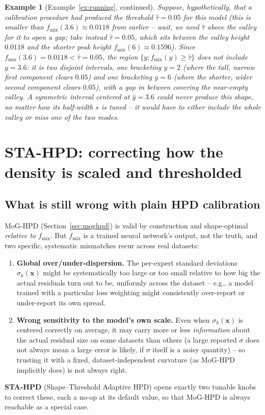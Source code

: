 \documentclass[11pt]{article}
\newtheorem{example}{Example}[section]
\begin{document}
\begin{example}[Example~\ref{ex:running}, continued]
Suppose, hypothetically, that a calibration procedure had produced the threshold $\hat\tau =
0.05$ for this model (this is smaller than $f_{\mathrm{mix}}(3.6)\approx0.0118$ from earlier --
wait, we need $\hat\tau$ \emph{above} the valley for it to open a gap; take instead $\hat\tau =
0.05$, which sits between the valley height $0.0118$ and the shorter peak height $f_{\mathrm{mix}}(6)
\approx 0.1596$). Since $f_{\mathrm{mix}}(3.6) = 0.0118 < \hat\tau = 0.05$, the region $\{y :
f_{\mathrm{mix}}(y)\ge\hat\tau\}$ does \emph{not} include $y=3.6$: it is two disjoint intervals,
one bracketing $y=2$ (where the tall, narrow first component clears $0.05$) and one bracketing
$y=6$ (where the shorter, wider second component clears $0.05$), with a gap in between covering
the near-empty valley. A symmetric interval centered at $\hat y=3.6$ could never produce this
shape, no matter how its half-width $s$ is tuned -- it would have to either include the whole
valley or miss one of the two modes.
\end{example}

\section{STA-HPD: correcting how the density is scaled and thresholded}
\label{sec:stahpd}

\subsection{What is still wrong with plain HPD calibration}

MoG-HPD (Section~\ref{sec:moghpd}) is valid by construction and shape-optimal \emph{relative to
$f_{\mathrm{mix}}$}. But $f_{\mathrm{mix}}$ is a trained neural network's output, not the truth,
and two specific, systematic mismatches recur across real datasets:
\begin{enumerate}[leftmargin=1.5em]
\item \textbf{Global over/under-dispersion.} The per-expert standard deviations $\sigma_k(\bm x)$
might be systematically too large or too small relative to how big the actual residuals turn out
to be, uniformly across the dataset -- e.g., a model trained with a particular loss weighting might
consistently over-report or under-report its own spread.
\item \textbf{Wrong sensitivity to the model's own scale.} Even when $\sigma_k(\bm x)$ is centered
correctly on average, it may carry more or less \emph{information} about the actual residual size
on some datasets than others (a large reported $\sigma$ does not always mean a large error is
likely, if $\sigma$ itself is a noisy quantity) -- so trusting it with a fixed, dataset-independent
curvature (as MoG-HPD implicitly does) is not always right.
\end{enumerate}
\textbf{STA-HPD} (Shape--Threshold Adaptive HPD) opens exactly two tunable knobs to correct these,
each a no-op at its default value, so that MoG-HPD is always reachable as a special case.
\end{document}
